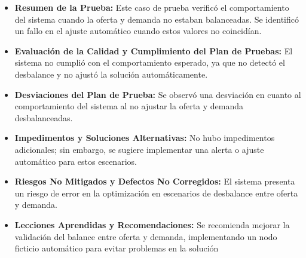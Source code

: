 \documentclass[stu, 12pt, letterpaper, donotrepeattitle, floatsintext, natbib]{apa7}
\begin{document}
\begin{itemize}
    \item \textbf{Resumen de la Prueba:} Este caso de prueba verificó el comportamiento del sistema cuando la oferta y demanda no estaban balanceadas. Se identificó un fallo en el ajuste automático cuando estos valores no coincidían.
    
    \item \textbf{Evaluación de la Calidad y Cumplimiento del Plan de Pruebas:} El sistema no cumplió con el comportamiento esperado, ya que no detectó el desbalance y no ajustó la solución automáticamente.
    
    \item \textbf{Desviaciones del Plan de Prueba:} Se observó una desviación en cuanto al comportamiento del sistema al no ajustar la oferta y demanda desbalanceadas.
    
    \item \textbf{Impedimentos y Soluciones Alternativas:} No hubo impedimentos adicionales; sin embargo, se sugiere implementar una alerta o ajuste automático para estos escenarios.
    
    \item \textbf{Riesgos No Mitigados y Defectos No Corregidos:} El sistema presenta un riesgo de error en la optimización en escenarios de desbalance entre oferta y demanda.
    \item \textbf{Lecciones Aprendidas y Recomendaciones:} Se recomienda mejorar la validación del balance entre oferta y demanda, implementando un nodo ficticio automático para evitar problemas en la solución
\end{itemize}
\end{document}

